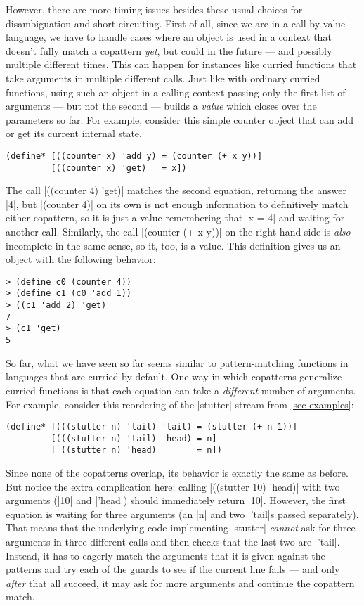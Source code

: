 However, there are more timing issues besides these usual choices for disambiguation and short-circuiting.
First of all, since we are in a call-by-value language, we have to handle cases where an object is used in a context that doesn't fully match a copattern \emph{yet}, but could in the future --- and possibly multiple different times.
This can happen for instances like curried functions that take arguments in multiple different calls.
Just like with ordinary curried functions, using such an object in a calling context passing only the first list of arguments --- but not the second --- builds a \emph{value} which closes over the parameters so far.
For example, consider this simple counter object that can add or get its current internal state.
\begin{lstlisting}[language=Scm]
(define* [((counter x) 'add y) = (counter (+ x y))]
         [((counter x) 'get)   = x])
\end{lstlisting}
The call \scm|((counter 4) 'get)| matches the second equation, returning the answer \scm|4|, but \scm|(counter 4)| on its own is not enough information to definitively match either copattern, so it is just a value remembering that \scm|x = 4| and waiting for another call.
Similarly, the call \scm|(counter (+ x y))| on the right-hand side is \emph{also} incomplete in the same sense, so it, too, is a value.
This definition gives us an object with the following behavior:
\begin{lstlisting}[language=Scm]
> (define c0 (counter 4))
> (define c1 (c0 'add 1))
> ((c1 'add 2) 'get)
7
> (c1 'get)
5
\end{lstlisting}

So far, what we have seen so far seems similar to pattern-matching functions in languages that are curried-by-default.
One way in which copatterns generalize curried functions is that each equation can take a \emph{different} number of arguments.
For example, consider this reordering of the \scm|stutter| stream from \cref{sec-examples}:
\begin{lstlisting}[language=Scm]
(define* [(((stutter n) 'tail) 'tail) = (stutter (+ n 1))]
         [(((stutter n) 'tail) 'head) = n]
         [ ((stutter n) 'head)        = n])
\end{lstlisting}
Since none of the copatterns overlap, its behavior is exactly the same as before.
But notice the extra complication here: calling \scm|((stutter 10) 'head)| with two arguments (\scm|10| and \scm|'head|) should immediately return \scm|10|.
However, the first equation is waiting for three arguments (an \scm|n| and two \scm|'tail|s passed separately).
That means that the underlying code implementing \scm|stutter| \emph{cannot} ask for three arguments in three different calls and then checks that the last two are \scm|'tail|.
Instead, it has to eagerly match the arguments that it is given against the patterns and try each of the guards to see if the current line fails --- and only \emph{after} that all succeed, it may ask for more arguments and continue the copattern match.

